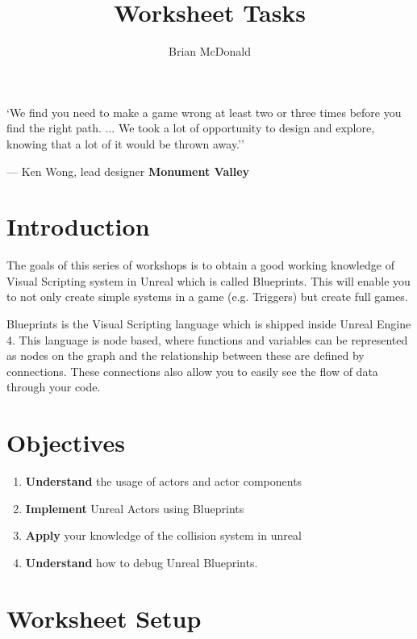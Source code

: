 \documentclass{../../../fal_assignment}
\title{Worksheet Tasks}
\author{Brian McDonald} %
\begin{document}
\maketitle

\begin{marginquote}
`We find you need to make a game wrong at least two or three times before you find the right path. ...
We took a lot of opportunity to design and explore, knowing that a lot of it would be thrown away.''
\par --- Ken Wong, lead designer \textbf{Monument Valley}
\end{marginquote}


\section*{Introduction}
The goals of this series of workshops is to obtain a good working knowledge of Visual Scripting system in Unreal which is called Blueprints. This will enable you to not only create simple systems in a game (e.g. Triggers) but create full games.

Blueprints is the Visual Scripting language which is shipped inside Unreal Engine 4. This language is node based, where functions and variables can be represented as nodes on the graph and the relationship between these are defined by connections. These connections also allow you to easily see the flow of data through your code.

\section*{Objectives}
\begin{enumerate}[label=(\Alph*)]
	\item \textbf{Understand} the usage of actors and actor components
	\item \textbf{Implement} Unreal Actors using Blueprints
  \item \textbf{Apply} your knowledge of the collision system in unreal
  \item \textbf{Understand} how to debug Unreal Blueprints.
\end{enumerate}

\section*{Worksheet Setup}
\end{document}
